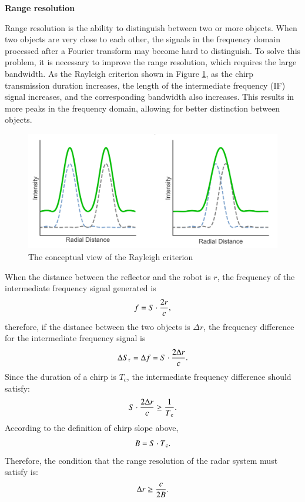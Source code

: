 \documentclass[12pt,DIV14,BCOR12mm,a4paper,footinclude=false,headinclude,parskip=half-,twoside,openright,cleardoublepage=empty,toc=index,bibliography=totoc,listof=totoc]{scrreprt}
\numberwithin{equation}{chapter}
\begin{document}
\begin{spacing}{1.5}
\textbf{\large{Range resolution}}
\end{spacing}

Range resolution is the ability to distinguish between two or more objects. When two objects are very close to each other, the signals in the frequency domain processed after a Fourier transform may become hard to distinguish. To solve this problem, it is necessary to improve the range resolution, which requires the large bandwidth. As the Rayleigh criterion shown in Figure \ref{range_resolution}, as the chirp transmission duration increases, the length of the intermediate frequency (IF) signal increases, and the corresponding bandwidth also increases. This results in more peaks in the frequency domain, allowing for better distinction between objects.

\begin{figure}[t]
	\centering
	\includegraphics[scale=.5]{figures/rayleigh_criterion.png}
	\caption{The conceptual view of the Rayleigh criterion \cite{granite_rayleigh_nodate}}
	\label{range_resolution}
\end{figure}

When the distance between the reflector and the robot is $r$, the frequency of the intermediate frequency signal generated is
\begin{equation}
    \centering
    f = S\cdot\frac{2r}{c},
\end{equation}
therefore, if the distance between the two objects is $\Delta r$, the frequency difference for the intermediate frequency signal is
\begin{equation}
    \centering
    \Delta S_\tau = \Delta f = S\cdot\frac{2\Delta r}{c}.
\end{equation}
Since the duration of a chirp is $T_c$, the intermediate frequency difference should satisfy:
\begin{equation}
    \centering
    S\cdot\frac{2\Delta r}{c} \geq \frac{1}{T\textsubscript{c}}.
    \label{intermediate frequency difference formula}
\end{equation}
According to the definition of chirp slope above,
\begin{equation}
    \centering
    B = S \cdot T\textsubscript{c}.
\end{equation}
Therefore, the condition that the range resolution of the radar system must satisfy is:
\begin{equation}
    \centering
    \Delta r \geq \frac{c}{2B}.
    \label{range resolution formula}
\end{equation}
\end{document}

